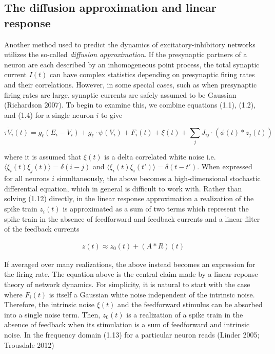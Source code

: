 \documentclass{ucetd}
\begin{document}
\subsection{The diffusion approximation and linear response}

Another method used to predict the dynamics of excitatory-inhibitory networks utilizes the so-called \emph{diffusion approximation}. If the presynaptic partners of a neuron are each described by an inhomogeneous point process, the total synaptic current $I(t)$ can have complex statistics depending on presynaptic firing rates and their correlations. However, in some special cases, such as when presynaptic firing rates are large, synaptic currents are safely assumed to be Gaussian (Richardson 2007). To begin to examine this, we combine equations (1.1), (1.2), and (1.4) for a single neuron $i$ to give 

\begin{equation}
\tau\dot{V}_{i}(t) = g_{\ell}(E_{i} - V_{i}) + g_{\ell}\cdot\psi(V_{i}) + F_{i}(t) + \xi(t) + \sum_{j} J_{ij}\cdot \left(\phi(t) * z_{j}(t)\right)
\end{equation}

where it is assumed that $\xi(t)$ is a delta correlated white noise i.e. $\langle\xi_{i}(t)\xi_{j}(t)\rangle = \delta(i-j)$ and $\langle\xi_{i}(t)\xi_{i}(t')\rangle = \delta(t-t')$. When expressed for all neurons $i$ simultaneously, the above becomes a high-dimensional stochastic differential equation, which in general is difficult to work with. Rather than solving (1.12) directly, in the linear response approximation a realization of the spike train $z_{i}(t)$ is approximated as a sum of two terms which represent the spike train in the absence of feedforward and feedback currents and a linear filter of the feedback currents

\begin{align}
z(t) \approx z_{0}(t) + (A * R)(t) 
\end{align}

If averaged over many realizations, the above instead becomes an expression for the firing rate. The equation above is the central claim made by a linear reponse theory of network dynamics. For simplicity, it is natural to start with the case where $F_{i}(t)$ is itself a Gaussian white noise independent of the intrinsic noise. Therefore, the intrinsic noise $\xi(t)$ and the feedforward stimulus can be absorbed into a single noise term. Then, $z_{0}(t)$ is a realization of a spike train in the absence of feedback when its stimulation is a sum of feedforward and intrinsic noise. In the frequency domain (1.13) for a particular neuron reads (Linder 2005; Trousdale 2012)
\end{document}
